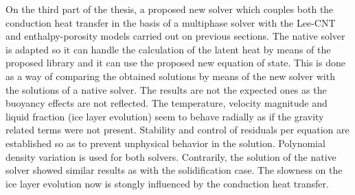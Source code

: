 \noindent On the third part of the thesis, a proposed new solver which couples both the conduction heat transfer in the basis of a multiphase solver with the Lee-CNT and enthalpy-porosity models carried out on previous sections. The native solver is adapted so it can handle the calculation of the latent heat by means of the proposed library and it can use the proposed new equation of state. This is done as a way of comparing the obtained solutions by means of the new solver with the solutions of a native solver. The results are not the expected ones as the buoyancy effects are not reflected. The temperature, velocity magnitude and liquid fraction (ice layer evolution) seem to behave radially as if the gravity related terms were not present. Stability and control of residuals per equation are established so as to prevent unphysical behavior in the solution. Polynomial density variation is used for both solvers. 
Contrarily, the solution of the native solver showed similar results as with the solidification case. The slowness on the ice layer evolution now is stongly influenced by the conduction heat transfer. 

